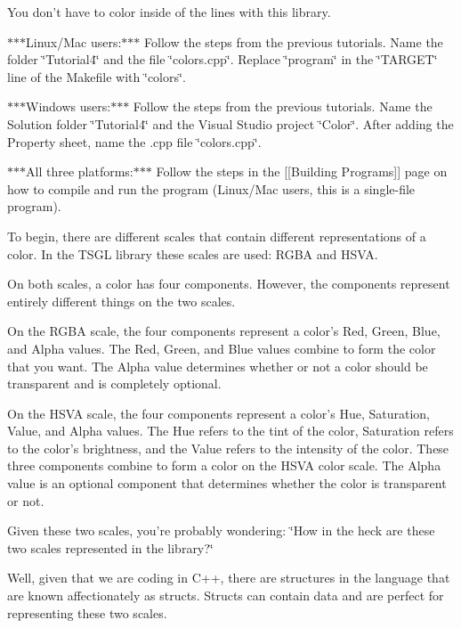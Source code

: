 You don't have to color inside of the lines with this library.

$\ast$$\ast$$\ast$\-Linux/\-Mac users\-:$\ast$$\ast$$\ast$ Follow the steps from the previous tutorials. Name the folder \char`\"{}\-Tutorial4\char`\"{} and the file \char`\"{}colors.\-cpp\char`\"{}. Replace \char`\"{}program\char`\"{} in the \char`\"{}\-T\-A\-R\-G\-E\-T\char`\"{} line of the Makefile with \char`\"{}colors\char`\"{}.

$\ast$$\ast$$\ast$\-Windows users\-:$\ast$$\ast$$\ast$ Follow the steps from the previous tutorials. Name the Solution folder \char`\"{}\-Tutorial4\char`\"{} and the Visual Studio project \char`\"{}\-Color\char`\"{}. After adding the Property sheet, name the .cpp file \char`\"{}colors.\-cpp\char`\"{}.

$\ast$$\ast$$\ast$\-All three platforms\-:$\ast$$\ast$$\ast$ Follow the steps in the \mbox{[}\mbox{[}Building Programs\mbox{]}\mbox{]} page on how to compile and run the program (Linux/\-Mac users, this is a single-\/file program).

To begin, there are different scales that contain different representations of a color. In the T\-S\-G\-L library these scales are used\-: R\-G\-B\-A and H\-S\-V\-A.

On both scales, a color has four components. However, the components represent entirely different things on the two scales.

On the R\-G\-B\-A scale, the four components represent a color's Red, Green, Blue, and Alpha values. The Red, Green, and Blue values combine to form the color that you want. The Alpha value determines whether or not a color should be transparent and is completely optional.

On the H\-S\-V\-A scale, the four components represent a color's Hue, Saturation, Value, and Alpha values. The Hue refers to the tint of the color, Saturation refers to the color's brightness, and the Value refers to the intensity of the color. These three components combine to form a color on the H\-S\-V\-A color scale. The Alpha value is an optional component that determines whether the color is transparent or not.

Given these two scales, you're probably wondering\-: \char`\"{}\-How in the heck are these two scales represented in the library?\char`\"{}

Well, given that we are coding in C++, there are structures in the language that are known affectionately as {\ttfamily structs}. Structs can contain data and are perfect for representing these two scales.

